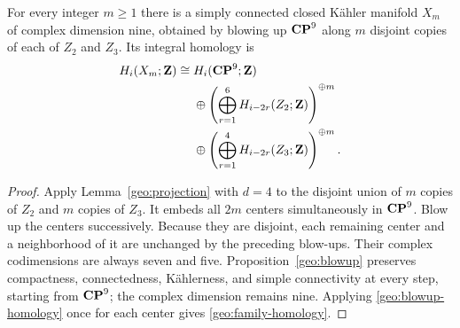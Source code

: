 \begin{proposition}
\label{geo:family}
For every integer $m\geq1$ there is a simply connected closed K\"ahler
manifold $X_m$ of complex dimension nine, obtained by blowing up
$\mathbf{CP}^9$ along $m$ disjoint copies of each of $Z_2$ and $Z_3$. Its
integral homology is
\begin{equation}
\label{geo:family-homology}
\begin{split}
 H_i(X_m;\mathbf Z)\cong{}&H_i(\mathbf{CP}^9;\mathbf Z)\\
 &\oplus\left(\bigoplus_{r=1}^{6}H_{i-2r}(Z_2;\mathbf Z)\right)^{\oplus m}\\
 &\oplus\left(\bigoplus_{r=1}^{4}H_{i-2r}(Z_3;\mathbf Z)\right)^{\oplus m}.
\end{split}
\end{equation}
\end{proposition}

\begin{proof}
Apply Lemma~\ref{geo:projection} with $d=4$ to the disjoint union of
$m$ copies of $Z_2$ and $m$ copies of $Z_3$. It embeds all $2m$ centers
simultaneously in $\mathbf{CP}^9$. Blow up the centers successively. Because
they are disjoint, each remaining center and a neighborhood of it are
unchanged by the preceding blow-ups. Their complex codimensions are
always seven and five. Proposition~\ref{geo:blowup} preserves
compactness, connectedness, K\"ahlerness, and simple connectivity at
every step, starting from $\mathbf{CP}^9$; the complex dimension remains nine.
Applying \eqref{geo:blowup-homology} once for each center gives
\eqref{geo:family-homology}.
\end{proof}
